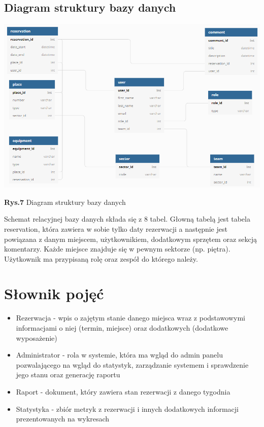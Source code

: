 \documentclass{article}
\begin{document}
\subsection{Diagram struktury bazy danych}
\hspace*{-1.5cm}\includegraphics[scale=0.6]{db_diagram}
\begin{center}\textbf{Rys.7} Diagram struktury bazy danych \end{center}
Schemat relacyjnej bazy danych składa się z 8 tabel. Głowną tabelą jest tabela reservation, która zawiera w sobie tylko daty rezerwacji a następnie jest powiązana z danym miejscem, użytkownikiem, dodatkowym sprzętem oraz sekcją komentarzy. Każde miejsce znajduje się w pewnym sektorze (np. piętra). Użytkownik ma przypisaną rolę oraz zespół do którego należy.


\section{Słownik pojęć}
\begin{itemize}
  \item Rezerwacja - wpis o zajętym stanie danego miejsca wraz z podstawowymi informacjami o niej (termin, miejsce) oraz dodatkowych (dodatkowe wyposażenie)
  \item Administrator - rola w systemie, która ma wgląd do admin panelu pozwalającego na wgląd do statystyk, zarządzanie systemem i sprawdzenie jego stanu oraz generację raportu
  \item Raport - dokument, który zawiera stan rezerwacji z danego tygodnia
  \item Statystyka - zbiór metryk z rezerwacji i innych dodatkowych informacji prezentowanych na wykresach
\end{itemize}
\end{document}

